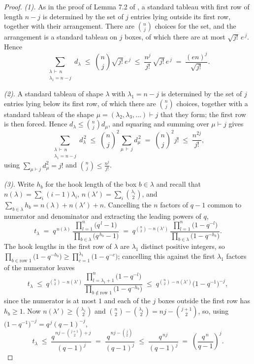 \documentclass[11pt]{article}
\theoremstyle{plain}  %
\begin{document}
\begin{proof}
\emph{(1).} As in the proof of Lemma 7.2 of \cite{DiaconisRam2000}, a standard
tableau with first row of length $n-j$ is determined by the set of $j$ entries
lying outside its first row, together with their arrangement. There are
$\binom{n}{j}$ choices for the set, and the arrangement is a standard tableau
on $j$ boxes, of which there are at most $\sqrt{j!}\,e^{\,j}$. Hence
$$
  \sum_{\substack{\lambda \,\vdash\, n \\ \lambda_1 = n-j}} d_\lambda
  \;\le\; \binom{n}{j}\sqrt{j!}\,e^{\,j}
  \;\le\; \frac{n^{j}}{j!}\,\sqrt{j!}\,e^{\,j}
  \;=\; \frac{(en)^{j}}{\sqrt{j!}} .
$$
 
\emph{(2).} A standard tableau of shape $\lambda$ with $\lambda_1 = n-j$ is
determined by the set of $j$ entries lying below its first row, of which there
are $\binom{n}{j}$ choices, together with a standard tableau of the shape
$\mu = (\lambda_2,\lambda_3,\dots) \vdash j$ that they form; the first row is
then forced. Hence $d_\lambda \le \binom{n}{j}d_\mu$, and squaring and summing
over $\mu \vdash j$ gives
$$
  \sum_{\substack{\lambda \,\vdash\, n \\ \lambda_1 = n-j}} d_\lambda^{\,2}
  \;\le\; \binom{n}{j}^{2}\sum_{\mu \,\vdash\, j} d_\mu^{\,2}
  \;=\; \binom{n}{j}^{2} j!
  \;\le\; \frac{n^{2j}}{j!} ,
$$
using $\sum_{\mu\vdash j} d_\mu^{2} = j!$ and $\binom{n}{j}\le \frac{n^{j}}{j!}$.
 
\emph{(3).} Write $h_b$ for the hook length of the box $b \in \lambda$ and
recall that $n(\lambda) = \sum_i (i-1)\lambda_i$,
$n(\lambda') = \sum_i \binom{\lambda_i}{2}$, and
$\sum_{b \in \lambda} h_b = n(\lambda)+n(\lambda')+n$. Cancelling the $n$
factors of $q-1$ common to numerator and denominator and extracting the
leading powers of $q$,
$$
  t_\lambda
  \;=\; q^{\,n(\lambda)}\,
        \frac{\prod_{l=1}^{n}\bigl(q^{\,l}-1\bigr)}
             {\prod_{b\in\lambda}\bigl(q^{\,h_b}-1\bigr)}
  \;=\; q^{\binom{n}{2}-n(\lambda')}\,
        \frac{\prod_{l=1}^{n}\bigl(1-q^{-l}\bigr)}
             {\prod_{b\in\lambda}\bigl(1-q^{-h_b}\bigr)} .
$$
The hook lengths in the first row of $\lambda$ are $\lambda_1$ distinct
positive integers, so
$\prod_{b \in \text{row }1}\bigl(1-q^{-h_b}\bigr) \ge
 \prod_{c=1}^{\lambda_1}\bigl(1-q^{-c}\bigr)$; cancelling this against the
first $\lambda_1$ factors of the numerator leaves
$$
  t_\lambda
  \;\le\; q^{\binom{n}{2}-n(\lambda')}\,
          \frac{\prod_{l=\lambda_1+1}^{n}\bigl(1-q^{-l}\bigr)}
               {\prod_{b \notin \text{row }1}\bigl(1-q^{-h_b}\bigr)}
  \;\le\; q^{\binom{n}{2}-n(\lambda')}\bigl(1-q^{-1}\bigr)^{-j},
$$
since the numerator is at most $1$ and each of the $j$ boxes outside the first
row has $h_b \ge 1$. Now $n(\lambda') \ge \binom{\lambda_1}{2}$ and
$\binom{n}{2}-\binom{\lambda_1}{2} = nj-\binom{j+1}{2}$, so, using
$\bigl(1-q^{-1}\bigr)^{-j} = q^{\,j}(q-1)^{-j}$,
$$
  t_\lambda
  \;\le\; \frac{q^{\,nj-\binom{j+1}{2}+j}}{(q-1)^{j}}
  \;=\; \frac{q^{\,nj-\binom{j}{2}}}{(q-1)^{j}}
  \;\le\; \frac{q^{\,nj}}{(q-1)^{j}}
  \;=\; \left(\frac{q^{\,n}}{q-1}\right)^{j} .
$$
\end{proof}
 
\end{document}
